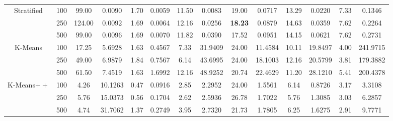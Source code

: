 \documentclass[preprint,12pt]{elsarticle}
\begin{document}
\begin{table}[!t]
{\begin{tabular}{cc|cc|cc|cc|cc|cc|cc}
\multirow{3}{*}{Stratified}            & 100    & 99.00           & 0.0090            & 1.70            & 0.0059           & 11.50            & 0.0083           & 19.00          & 0.0717           & 13.29           & 0.0220           & 7.33            & 0.1346           \\
                                       & 250    & 124.00          & 0.0092            & 1.69            & 0.0064           & 12.16            & 0.0256           & \textbf{18.23} & 0.0879           & 14.63           & 0.0359           & 7.62            & 0.2264           \\
                                       & 500    & 99.00           & 0.0096            & 1.69            & 0.0070           & 11.82            & 0.0390           & 17.52          & 0.0951           & 14.15           & 0.0621           & 7.62            & 0.2731           \\ \hline
\multirow{3}{*}{K-Means}               & 100    & 17.25           & 5.6928            & 1.63            & 0.4567           & 7.33             & 31.9409          & 24.00          & 11.4584          & 10.11           & 19.8497          & 4.00            & 241.9715         \\
                                       & 250    & 49.00           & 6.9879            & 1.84            & 0.7567           & 6.14             & 43.6995          & 24.00          & 18.1003          & 12.16           & 20.5799          & 3.81            & 179.3882         \\
                                       & 500    & 61.50           & 7.4519            & 1.63            & 1.6992           & 12.16            & 48.9252          & 20.74          & 22.4629          & 11.20           & 28.1210          & 5.41            & 200.4378         \\ \hline
\multirow{3}{*}{K-Means$++$}           & 100    & 4.26            & 10.1263           & 0.47            & 0.0916           & 2.85             & 2.2952           & 24.00          & 1.5561           & 6.14            & 0.8726           & 3.17   & 3.3108           \\
                                       & 250    & 5.76            & 15.0373           & 0.56            & 0.1704           & 2.62             & 2.5936           & 26.78          & 1.7022           & 5.76            & 1.3085           & 3.03   & 6.2857           \\
                                       & 500    & 4.74            & 31.7062           & 1.37            & 0.2749           & 3.95             & 2.7320           & 21.73          & 1.7805           & 6.25            & 1.6275           & 2.91   & 9.7771           \\ \hline

\end{tabular}}
\end{table}
\end{document}

